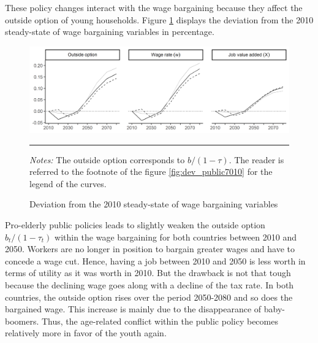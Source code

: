 These policy changes interact with the wage bargaining because they affect the outside option of young households. Figure \ref{fig:dev_bargain1080} displays the deviation from the 2010 steady-state of wage bargaining variables in percentage.
\begin{figure}[!b]
	\centering
	\includegraphics[width=1\linewidth]{../result/deviation/dev_bargain1080.png}
	\caption{Deviation from the 2010 steady-state of wage bargaining variables}
	\label{fig:dev_bargain1080}
	\vspace{.5ex}
	\hrule
	\vspace{-4ex}
	\justify\singlespacing\footnotesize \textit{Notes:} The outside option corresponds to $b/(1-\tau)$. The reader is referred to the footnote of the figure \ref{fig:dev_public7010} for the legend of the curves.
\end{figure}
Pro-elderly public policies leads to slightly weaken the outside option $b_t/(1-\tau_t)$ within the wage bargaining for both countries between 2010 and 2050. Workers are no longer in position to bargain greater wages and have to concede a wage cut. Hence, having a job between 2010 and 2050 is less worth in terms of utility as it was worth in 2010. But the drawback is not that tough because the declining wage goes along with a decline of the tax rate. In both countries, the outside option rises over the period 2050-2080 and so does the bargained wage. This increase is mainly due to the disappearance of baby-boomers. Thus, the age-related conflict within the public policy becomes relatively more in favor of the youth again.

